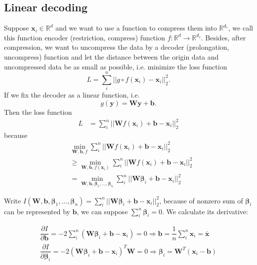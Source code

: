 \subsection{Linear decoding}
Suppose $\mathbf x_i\in \mathbb R^d$ and we want to use a function to
compress them into $\mathbb R^{d_c}$, we call this function encoder
(restriction, compress) function $f:\mathbb R^d\rightarrow \mathbb
R^{d_c}$. Besides, after compression, we want to uncompress the data
by a decoder (prolongation, uncompress) function and let the distance
between the origin data and uncompressed data be as small as possible,
i.e. minimize the loss function
\begin{equation}
  \label{encode-decode-loss}
	L=\sum_i^n||g\circ f(\mathbf x_i)-\mathbf x_i ||_2^2.  
\end{equation}
	If we fix the decoder as a linear function, i.e.
        \begin{equation}
          \label{linear-encoding}
	g(\mathbf y)=\mathbf W\mathbf y+\mathbf b.          
        \end{equation}
	Then the loss function 
	\begin{align*}
	L&=\sum_i^n||\mathbf W f(\mathbf x_i)+\mathbf b-\mathbf x_i ||_2^2
	\end{align*}
	because 
	\begin{align*}
	&\min_{\mathbf W,\mathbf b,f} \sum_i^n||\mathbf W f(\mathbf x_i)+\mathbf b-\mathbf x_i ||_2^2\\
	&\geq \min_{\mathbf W,\mathbf b,f(\mathbf x_i)} \sum_i^n||\mathbf W f(\mathbf x_i)+\mathbf b-\mathbf x_i ||_2^2\\
	&=\min_{\mathbf W,\mathbf b,\bm\beta_1,...,\bm\beta_n} \sum_i^n||\mathbf W \bm \beta_i+\mathbf b-\mathbf x_i ||_2^2
	\end{align*}
	
	Write $ I(\mathbf W,\mathbf b,\bm\beta_1,...,\bm\beta_n)=\sum_i^n||\mathbf W \bm \beta_i+\mathbf b-\mathbf x_i ||_2^2$, because of nonzero sum of $\bm \beta_i$ can be represented by $\mathbf b$, we can suppose $\sum_i^n \bm \beta_i = 0$. We calculate its derivative:
	
	
	\begin{align*}
	\dfrac{\partial I}{\partial \mathbf b}=-2\sum_i^n (\mathbf W \bm \beta_i+\mathbf b-\mathbf x_i )=0 \Rightarrow \mathbf b = \dfrac 1n \sum_i^n \mathbf x_i=\bar {\mathbf x}\\
	\dfrac{\partial I}{\partial \bm \beta_i}=-2 (\mathbf W \bm \beta_i+\mathbf b-\mathbf x_i )^T\mathbf W=0\Rightarrow \bm \beta_i =\mathbf W^T(\mathbf x_i -\mathbf b)
	\end{align*}
	
